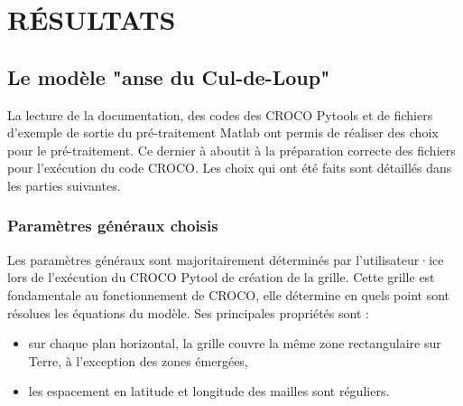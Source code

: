 \documentclass[10pt,a4paper,titlepage]{article}
\begin{document}
\newpage
\section{RÉSULTATS}
\label{sec:resultats}


\subsection{Le modèle "anse du Cul-de-Loup"}
\label{sub:modele_ADCL}




La lecture de la documentation, des codes des CROCO Pytools et de fichiers d'exemple de sortie du pré-traitement Matlab ont permis de réaliser des choix pour le pré-traitement.
Ce dernier à aboutit à la préparation correcte des fichiers pour l'exécution du code CROCO.
Les choix qui ont été faits sont détaillés dans les parties suivantes.


\subsubsection{Paramètres généraux choisis}
\label{subsub:param_generaux}

Les paramètres généraux sont majoritairement déterminés par l'utilisateur·ice lors de l'exécution du CROCO Pytool de création de la grille.
Cette grille est fondamentale au fonctionnement de CROCO, elle détermine en quels point sont résolues les équations du modèle. Ses principales propriétés sont :

\begin{itemize}
    \item sur chaque plan horizontal, la grille couvre la même zone rectangulaire sur Terre, à l'exception des zones émergées,
    \item les espacement en latitude et longitude des mailles sont réguliers.
\end{itemize}
\end{document}
